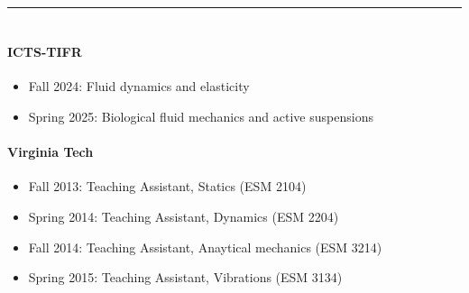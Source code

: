 \documentclass[10pt]{res} %
\begin{document}
\begin{resume}
\vspace*{-8mm}
\noindent\rule{\textwidth}{0.6pt}
\vspace*{-10mm}
\section{}
\paragraph{ICTS-TIFR}
\begin{itemize}
		\vspace*{2mm}
		\item Fall 2024: Fluid dynamics and elasticity
		\item Spring 2025: Biological fluid mechanics and active suspensions
\end{itemize} 

\paragraph{Virginia Tech} 
\begin{itemize}
	\vspace*{2mm}
	\item Fall 2013: Teaching Assistant, Statics  (ESM 2104)
	\item Spring 2014: Teaching Assistant, Dynamics (ESM 2204)
	\item Fall 2014: Teaching Assistant, Anaytical mechanics (ESM 3214)
	\item Spring 2015: Teaching Assistant, Vibrations (ESM 3134)
\end{itemize}

\vspace*{-2mm}

\end{resume}
\end{document}
